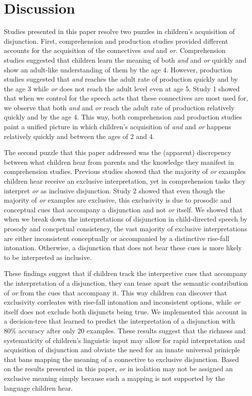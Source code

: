 \documentclass[10pt, letterpaper]{article}
\begin{document}
\section{Discussion}\label{discussion}

Studies presented in this paper resolve two puzzles in children's
acquisition of disjunction. First, comprehension and production studies
provided different accounts for the acquisition of the connectives
\emph{and} and \emph{or}. Comprehension studies suggested that children
learn the meaning of both \emph{and} and \emph{or} quickly and show an
adult-like understanding of them by the age 4. However, production
studies suggested that \emph{and} reaches the adult rate of production
quickly and by the age 3 while \emph{or} does not reach the adult level
even at age 5. Study 1 showed that when we control for the speech acts
that these connectives are most used for, we observe that both
\emph{and} and \emph{or} reach the adult rate of production relatively
quickly and by the age 4. This way, both comprehension and production
studies paint a unified picture in which children's acquisition of
\emph{and} and \emph{or} happens relatively quickly and between the ages
of 2 and 4.

The second puzzle that this paper addressed was the (apparent)
discrepency between what children hear from parents and the knowledge
they manifest in comprehension studies. Previous studies showed that the
majority of \emph{or} examples children hear receive an exclusive
interpretation, yet in comprehension tasks they interpret \emph{or} as
inclusive disjunction. Study 2 showed that even though the majority of
\emph{or} examples are exclusive, this exclusivity is due to prosodic
and conceptual cues that accompany a disjunction and not \emph{or}
itself. We showed that when we break down the interpretations of
disjunction in child-directed speech by prosody and concpetual
consistency, the vast majority of exclusive interpretations are either
inconsistent conceptually or accompanied by a distinctive rise-fall
intonation. Otherwise, a disjunction that does not bear these cues is
more likely to be interpreted as inclusive.

These findings suggest that if children track the interpretive cues that
accompany the interpretation of a disjunction, they can tease apart the
semantic contribution of \emph{or} from the cues that accompany it. This
way children can discover that exclusivity corrleates with rise-fall
intonation and inconsistent options, while \emph{or} itself does not
exclude both disjuncts being true. We implemented this account in a
decision-tree that learned to predict the interpretation of a
disjunction with 80\% accuracy after only 20 examples. These results
suggest that the richness and systematicity of children's linguistic
input may allow for rapid interpretation and acquisition of disjunction
and obviate the need for an innate universal prinicple that bans mapping
the meaning of a connective to exclusive disjunction. Based on the
results presented in this paper, \emph{or} in isolation may not be
assigned an exclusive meaning simply because such a mapping is not
supported by the language children hear.
\end{document}

